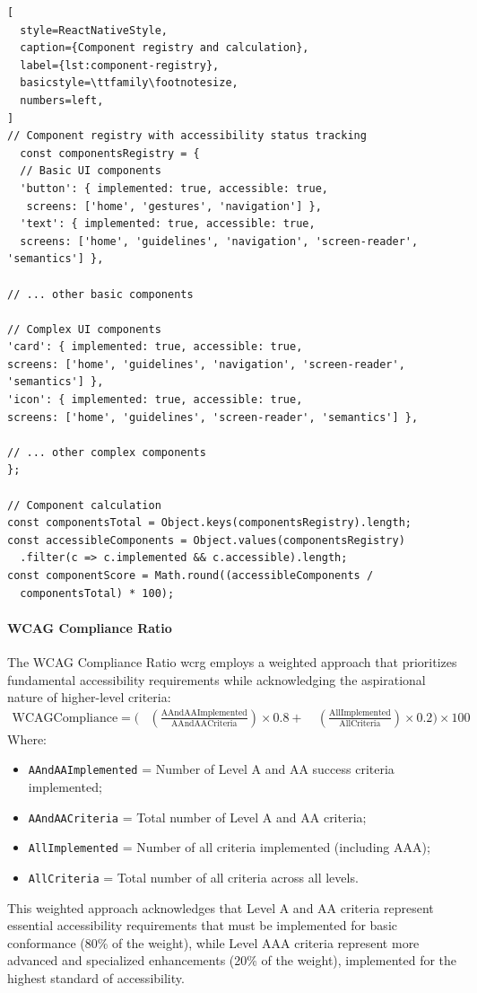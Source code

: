 \begin{lstlisting}[
  style=ReactNativeStyle,
  caption={Component registry and calculation},
  label={lst:component-registry},
  basicstyle=\ttfamily\footnotesize,
  numbers=left,
]
// Component registry with accessibility status tracking
  const componentsRegistry = {
  // Basic UI components
  'button': { implemented: true, accessible: true,
   screens: ['home', 'gestures', 'navigation'] },
  'text': { implemented: true, accessible: true,
  screens: ['home', 'guidelines', 'navigation', 'screen-reader', 'semantics'] },
  
// ... other basic components

// Complex UI components
'card': { implemented: true, accessible: true,
screens: ['home', 'guidelines', 'navigation', 'screen-reader', 'semantics'] },
'icon': { implemented: true, accessible: true,
screens: ['home', 'guidelines', 'screen-reader', 'semantics'] },

// ... other complex components
};

// Component calculation
const componentsTotal = Object.keys(componentsRegistry).length;
const accessibleComponents = Object.values(componentsRegistry)
  .filter(c => c.implemented && c.accessible).length;
const componentScore = Math.round((accessibleComponents / 
  componentsTotal) * 100);
\end{lstlisting}

\FloatBarrier

\paragraph{WCAG Compliance Ratio}

The WCAG Compliance Ratio {\gls{wcrg}} employs a weighted approach that prioritizes fundamental accessibility requirements while acknowledging the aspirational nature of higher-level criteria:
\begin{align}
\text{WCAGCompliance} = \Bigg(&\left(\frac{\text{AAndAAImplemented}}{\text{AAndAACriteria}}\right) \times 0.8 + \
&\left(\frac{\text{AllImplemented}}{\text{AllCriteria}}\right) \times 0.2\Bigg) \times 100
\end{align}
Where:
\begin{itemize}
\item \texttt{AAndAAImplemented} = Number of Level A and AA success criteria implemented;
\item \texttt{AAndAACriteria} = Total number of Level A and AA criteria;
\item \texttt{AllImplemented} = Number of all criteria implemented (including AAA);
\item \texttt{AllCriteria} = Total number of all criteria across all levels.
\end{itemize}
This weighted approach acknowledges that Level A and AA criteria represent essential accessibility requirements that must be implemented for basic conformance (80\% of the weight), while Level AAA criteria represent more advanced and specialized enhancements (20\% of the weight), implemented for the highest standard of accessibility. 

